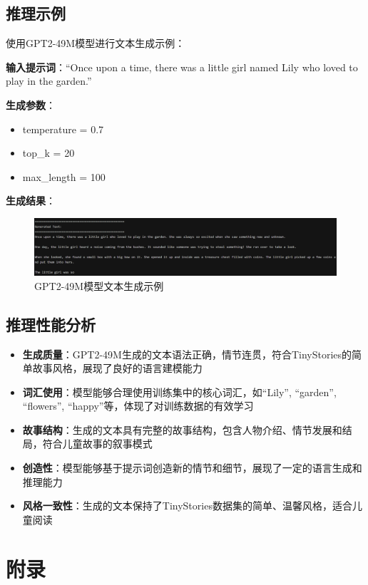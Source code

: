 \documentclass{article}
\begin{document}
\subsection{推理示例}
使用GPT2-49M模型进行文本生成示例：

\textbf{输入提示词}：``Once upon a time, there was a little girl named Lily who loved to play in the garden.''

\textbf{生成参数}：
\begin{itemize}
    \item temperature = 0.7
    \item top\_k = 20
    \item max\_length = 100
\end{itemize}

\textbf{生成结果}：

\begin{figure}[h]
    \centering
    \includegraphics[width=0.8\linewidth]{../inference_eg.png}
    \caption{GPT2-49M模型文本生成示例}
    \label{fig:inference_example}
\end{figure}

\subsection{推理性能分析}
\begin{itemize}
    \item \textbf{生成质量}：GPT2-49M生成的文本语法正确，情节连贯，符合TinyStories的简单故事风格，展现了良好的语言建模能力
    \item \textbf{词汇使用}：模型能够合理使用训练集中的核心词汇，如``Lily'', ``garden'', ``flowers'', ``happy''等，体现了对训练数据的有效学习
    \item \textbf{故事结构}：生成的文本具有完整的故事结构，包含人物介绍、情节发展和结局，符合儿童故事的叙事模式
    \item \textbf{创造性}：模型能够基于提示词创造新的情节和细节，展现了一定的语言生成和推理能力
    \item \textbf{风格一致性}：生成的文本保持了TinyStories数据集的简单、温馨风格，适合儿童阅读
\end{itemize}

\section{附录}
\end{document}
